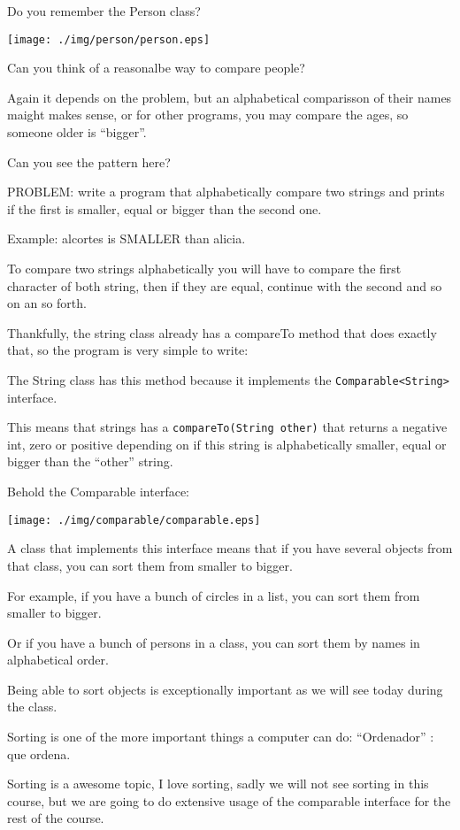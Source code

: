 \documentclass[a4paper, 9pt]{extarticle}
\newcommand{\separator}{\begin{center}%
\noindent\makebox[\linewidth]{\rule{0.75\paperwidth}{0.4pt}}%
\end{center}}
\begin{document}
\separator

Do you remember the Person class?

\begin{center}
  \texttt{[image: ./img/person/person.eps]}
\end{center}

Can you think of a reasonalbe way to compare people?

Again it depends on the problem, but an alphabetical comparisson of their names
maight makes sense, or for other programs, you may compare the ages, so someone
older is ``bigger''.

Can you see the pattern here?

\separator

PROBLEM: write a program that alphabetically compare two strings and prints if
the first is smaller, equal or bigger than the second one.

Example: alcortes is SMALLER than alicia.

To compare two strings alphabetically you will have to compare the first
character of both string, then if they are equal, continue with the second and
so on an so forth.

Thankfully, the string class already has a compareTo method that does exactly
that, so the program is very simple to write:


The String class has this method because it implements the \verb+Comparable<String>+ interface.

This means that strings has a \verb+compareTo(String other)+ that returns a
negative int, zero or positive depending on if this string is alphabetically
smaller, equal or bigger than the ``other'' string.

Behold the Comparable interface:

\begin{center}
  \texttt{[image: ./img/comparable/comparable.eps]}
\end{center}

A class that implements this interface means that if you have several objects
from that class, you can sort them from smaller to bigger.

For example, if you have a bunch of circles in a list, you can sort them from smaller to bigger.

Or if you have a bunch of persons in a class, you can sort them by names in alphabetical order.

Being able to sort objects is exceptionally important as we will see today during the class.

Sorting is one of the more important things a computer can do: ``Ordenador'' : que ordena.

Sorting is a awesome topic, I love sorting, sadly we will not see sorting in this course, but
we are going to do extensive usage of the comparable interface for the rest of
the course.
\end{document}
